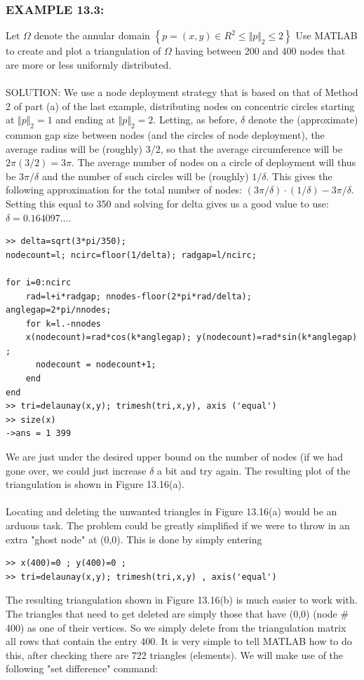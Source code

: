 \documentclass[../main.tex]{subfiles}
\begin{document}
\subsubsection{EXAMPLE 13.3:} Let $\Omega$ denote the annular domain $\left\{ p = (x,y) \in  R^2 \leqslant \Vert p \Vert_2 \leqslant 2 \right\}$  Use MATLAB to create and plot a triangulation of $\Omega$ having between 200 
and 400 nodes that are more or less uniformly distributed.
\\
\\
SOLUTION: We use a node deployment strategy that is based on that of Method 
2 of part (a) of the last example, distributing nodes on concentric circles starting at $\Vert p \Vert_2 = 1$ and ending at $\Vert p \Vert_2 = 2$. Letting, as before, $\delta$ denote the (approximate) 
common gap size between nodes (and the circles of node deployment), the average 
radius will be (roughly) 3/2, so that the average circumference will be 
$2\pi\left( 3/2 \right) = 3\pi$. The average number of nodes on a circle of deployment will thus 
be $3\pi/\delta$ and the number of such circles will be (roughly) $1/\delta$. This gives the following approximation for the total number of nodes: $(3\pi/\delta)\cdot(1/\delta)-3\pi/\delta$. 
Setting this equal to 350 and solving for delta gives us a good value to use: 
$\delta = 0.164097...$.
\\
\begin{lstlisting}[numbers=none,frame=none]
>> delta=sqrt(3*pi/350); 
nodecount=l; ncirc=floor(1/delta); radgap=l/ncirc; 

for i=0:ncirc 
	rad=l+i*radgap; nnodes-floor(2*pi*rad/delta); anglegap=2*pi/nnodes; 
	for k=l.-nnodes 
	x(nodecount)=rad*cos(k*anglegap); y(nodecount)=rad*sin(k*anglegap) ; 
	  nodecount = nodecount+1; 
	end 
end 
>> tri=delaunay(x,y); trimesh(tri,x,y), axis ('equal') 
>> size(x) 
->ans = 1 399
\end{lstlisting}
We are just under the desired upper bound on the number of nodes (if we had gone 
over, we could just increase $\delta$ a bit and try again. The resulting plot of the 
triangulation is shown in Figure 13.16(a).
\\
\\ 
Locating and deleting the unwanted triangles in Figure 13.16(a) would be an 
arduous task. The problem could be greatly simplified if we were to throw in an 
extra "ghost node" at (0,0). This is done by simply entering 
\begin{lstlisting}[numbers=none,frame=none]
>> x(400)=0 ; y(400)=0 ; 
>> tri=delaunay(x,y); trimesh(tri,x,y) , axis('equal')
\end{lstlisting}
The resulting triangulation shown in Figure 13.16(b) is much easier to work with. 
The triangles that need to get deleted are simply those that have (0,0) (node $\#$400) 
as one of their vertices. So we simply delete from the triangulation matrix all rows 
that contain the entry 400. It is very simple to tell MATLAB how to do this, after 
checking there are 722 triangles (elements). We will make use of the following 
"set difference" command:
\end{document}
